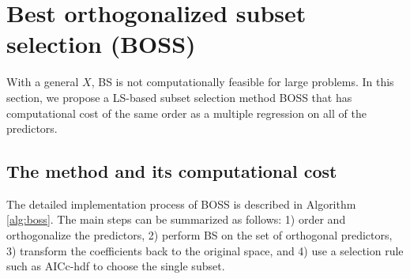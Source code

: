 \section{Best orthogonalized subset selection (BOSS)}
\label{sec:boss}
With a general $X$, BS is not computationally feasible for large problems. In this section, we propose a LS-based subset selection method BOSS that has computational cost of the same order as a multiple regression on all of the predictors. 

\subsection{The method and its computational cost}
\label{sec:boss_alg}
The detailed implementation process of BOSS is described in Algorithm \ref{alg:boss}. The main steps can be summarized as follows: 1) order and orthogonalize the predictors, 2) perform BS on the set of orthogonal predictors, 3) transform the coefficients back to the original space, and 4) use a selection rule such as AICc-hdf to choose the single subset.

